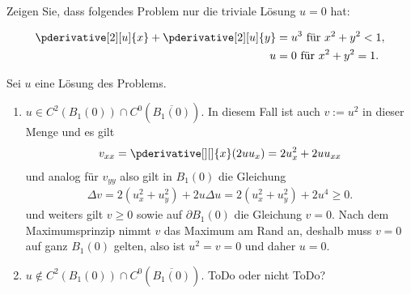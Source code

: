 
\begin{exercise}

Zeigen Sie, dass folgendes Problem nur die triviale Lösung $u = 0$ hat:

\begin{align*}
    \pderivative[2][u]{x} + \pderivative[2][u]{y} & = u^3 ~\text{für}~ x^2 + y^2 < 1, \\
    \quad
    u & = 0 ~\text{für}~ x^2 + y^2 = 1.
\end{align*}

\end{exercise}


\begin{solution}
	Sei $u$ eine Lösung des Problems.
	\begin{enumerate}[label = Fall \arabic*:]
		\item $u \in C^2(B_1(0)) \cap C^0(\overline{B_1(0)})$. In diesem Fall ist auch $v := u^2$ in dieser Menge und es gilt
		\begin{align*}
		v_{xx} = \pderivative[][]{x}(2 u u_x) = 2 u_x^2 + 2 u u_{xx}
		\end{align*}
		und analog für $v_{yy}$ also gilt in $B_1(0)$ die Gleichung
		\begin{align*}
		\Delta v = 2 (u_x^2 + u_y^2) + 2 u \Delta u = 2(u_x^2 + u_y^2) + 2 u^4 \geq 0.
		\end{align*}
		und weiters gilt $v \geq 0$ sowie auf $\partial B_1(0)$ die Gleichung $v = 0$. Nach dem Maximumsprinzip nimmt $v$ das Maximum am Rand an, deshalb muss $v = 0$ auf ganz $B_1(0)$ gelten, also ist $u^2 = v = 0$ und daher $u = 0$.

		\item $u \notin C^2(B_1(0)) \cap C^0(\overline{B_1(0)})$. ToDo oder nicht ToDo?
	\end{enumerate}

\end{solution}

